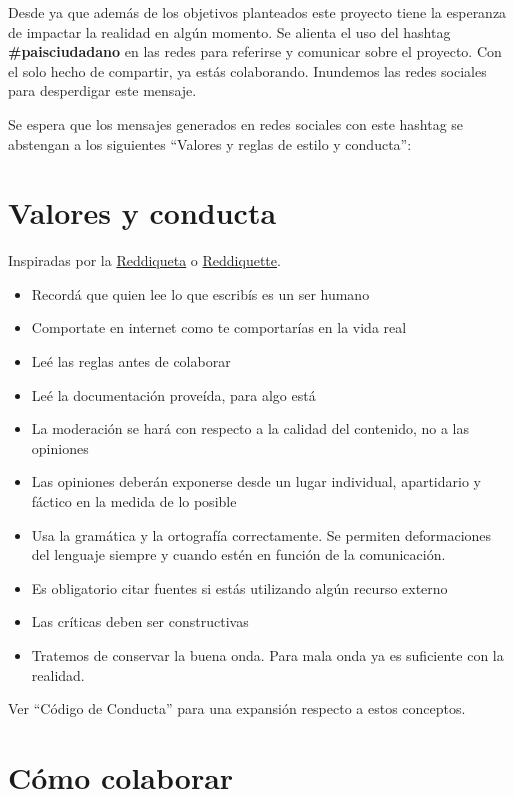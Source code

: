 \documentclass[
]{book}
\providecommand{\tightlist}{%
  \setlength{\itemsep}{0pt}\setlength{\parskip}{0pt}}
\begin{document}
Desde ya que además de los objetivos planteados este proyecto tiene la esperanza de impactar la realidad en algún momento. Se alienta el uso del hashtag \textbf{\#paisciudadano} en las redes para referirse y comunicar sobre el proyecto. Con el solo hecho de compartir, ya estás colaborando. Inundemos las redes sociales para desperdigar este mensaje.

Se espera que los mensajes generados en redes sociales con este hashtag se abstengan a los siguientes ``Valores y reglas de estilo y conducta'':

\hypertarget{valores-y-conducta}{%
\section{Valores y conducta}\label{valores-y-conducta}}

Inspiradas por la \href{https://www.reddit.com/wiki/es/reddiquette}{Reddiqueta} o \href{https://reddit.zendesk.com/hc/en-us/articles/205926439-Reddiquette}{Reddiquette}.

\begin{itemize}
\tightlist
\item
  Recordá que quien lee lo que escribís es un ser humano
\item
  Comportate en internet como te comportarías en la vida real
\item
  Leé las reglas antes de colaborar
\item
  Leé la documentación proveída, para algo está
\item
  La moderación se hará con respecto a la calidad del contenido, no a las opiniones
\item
  Las opiniones deberán exponerse desde un lugar individual, apartidario y fáctico en la medida de lo posible
\item
  Usa la gramática y la ortografía correctamente. Se permiten deformaciones del lenguaje siempre y cuando estén en función de la comunicación.
\item
  Es obligatorio citar fuentes si estás utilizando algún recurso externo
\item
  Las críticas deben ser constructivas
\item
  Tratemos de conservar la buena onda. Para mala onda ya es suficiente con la realidad.
\end{itemize}

Ver ``Código de Conducta'' para una expansión respecto a estos conceptos.

\hypertarget{cuxf3mo-colaborar}{%
\section{Cómo colaborar}\label{cuxf3mo-colaborar}}
\end{document}
